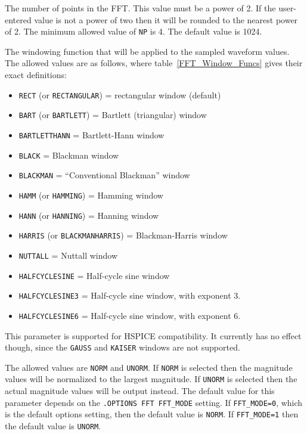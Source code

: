 \begin{Command}
\begin {Arguments}
The number of points in the FFT.  This value must be a power of 2.  If
the user-entered value is not a power of two then it will be rounded to
the nearest power of 2.  The minimum allowed value of {\tt NP} is 4.
The default value is 1024.

The windowing function that will be applied to the sampled waveform
values.  The allowed values are as follows, where table~\ref{FFT_Window_Funcs}
gives their exact definitions:

\begin{itemize}
  \item \texttt{RECT} (or \texttt{RECTANGULAR}) = rectangular window (default)
  \item \texttt{BART} (or \texttt{BARTLETT}) = Bartlett (triangular) window
  \item \texttt{BARTLETTHANN} = Bartlett-Hann window
  \item \texttt{BLACK} = Blackman window
  \item \texttt{BLACKMAN} = ``Conventional Blackman'' window
  \item \texttt{HAMM} (or \texttt{HAMMING}) = Hamming window
  \item \texttt{HANN} (or \texttt{HANNING}) = Hanning window
  \item \texttt{HARRIS} (or \texttt{BLACKMANHARRIS}) = Blackman-Harris window
  \item \texttt{NUTTALL} = Nuttall window
  \item \texttt{HALFCYCLESINE} = Half-cycle sine window
  \item \texttt{HALFCYCLESINE3} = Half-cycle sine window, with exponent 3.
  \item \texttt{HALFCYCLESINE6} = Half-cycle sine window, with exponent 6.
\end{itemize}

This parameter is supported for HSPICE compatibility. It currently
has no effect though, since the {\tt GAUSS} and {\tt KAISER} windows
are not supported.

The allowed values are {\tt NORM} and {\tt UNORM}.  If {\tt NORM} is
selected then the magnitude values will be normalized to the largest
magnitude.  If {\tt UNORM} is selected then the actual magnitude values
will be output instead.  The default value for this parameter depends
on the \texttt{.OPTIONS FFT FFT\_MODE} setting.  If \texttt{FFT\_MODE=0},
which is the default options setting, then the default value is {\tt NORM}.
If \texttt{FFT\_MODE=1} then the default value is {\tt UNORM}.


\end{Arguments}
\end{Command}
